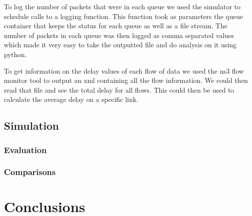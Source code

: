 \documentclass{article}
\begin{document}
To log the number of packets that were in each queue we used the simulator to schedule calls to a logging function.
This function took as parameters the queue container that keeps the status for each queue as well as a file stream.
The number of packets in each queue was then logged as comma separated values which made it very easy to take the outputted file and do analysis on it using python.

To get information on the delay values of each flow of data we used the ns3 flow monitor tool to output an xml containing all the flow information.
We could then read that file and see the total delay for all flows.
This could then be used to calculate the average delay on a specific link.

\subsection{Simulation}

\subsubsection{Evaluation}

\subsubsection{Comparisons}

\section{Conclusions}
\end{document}
